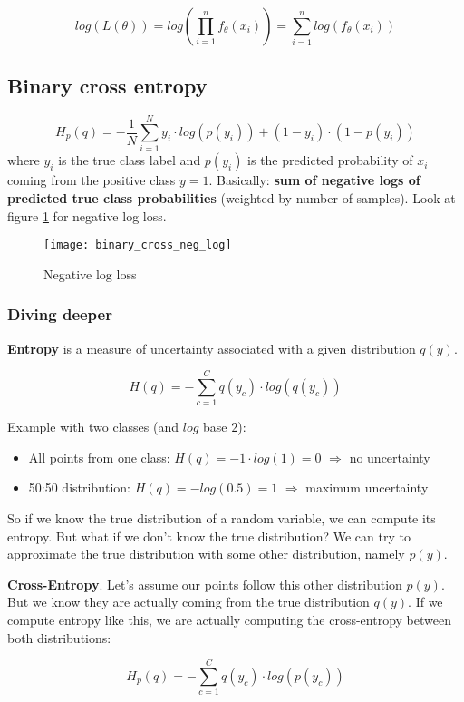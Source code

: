 $$log(L(\theta)) = log(\prod_{i=1}^n f_{\theta}(x_i)) = \sum_{i=1}^n log(f_{\theta}(x_i))$$

\subsection[Binary cross entropy]{Binary cross entropy \cite{bce-tds}}
$$H_p(q) = -\frac{1}{N} \sum_{i=1}^N y_i \cdot log(p(y_i)) + (1-y_i) \cdot (1-p(y_i))$$
where $y_i$ is the true class label and $p(y_i)$ is the predicted probability of $x_i$ coming from the positive class $y=1$. Basically: \textbf{sum of negative logs of predicted true class probabilities} (weighted by number of samples). Look at figure \ref{fig:binary_cross_neg_log} for negative log loss.

\begin{figure}
	\centering
		\texttt{[image: binary\_cross\_neg\_log]}
	\caption{Negative log loss}
	\label{fig:binary_cross_neg_log}
\end{figure}

\subsubsection{Diving deeper}
\textbf{Entropy} is a measure of uncertainty associated with a given distribution $q(y)$.

$$H(q) = - \sum_{c=1}^C q(y_c) \cdot log(q(y_c))$$

Example with two classes (and $log$ base $2$):
\begin{itemize}
	\item
		All points from one class: $H(q) = - 1 \cdot log(1) = 0$ $\Rightarrow$ no uncertainty
	\item
		50:50 distribution: $H(q) = -log(0.5) = 1$ $\Rightarrow$ maximum uncertainty
\end{itemize}

So if we know the true distribution of a random variable, we can compute its entropy. But what if we don't know the true distribution? We can try to approximate the true distribution with some other distribution, namely $p(y)$.

\textbf{Cross-Entropy}. Let's assume our points follow this other distribution $p(y)$. But we know they are actually coming from the true distribution $q(y)$. If we compute entropy like this, we are actually computing the cross-entropy between both distributions:

$$H_p(q) = - \sum_{c=1}^C q(y_c) \cdot log(p(y_c))$$

